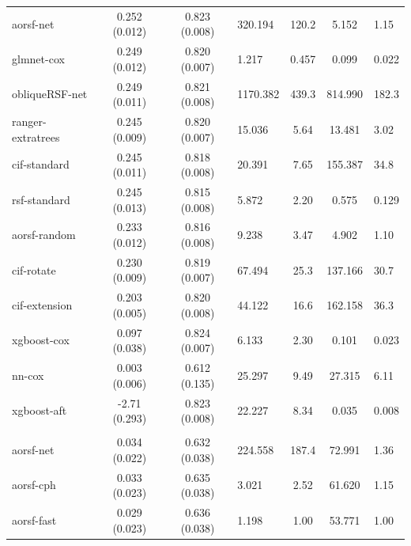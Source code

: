 \documentclass[twoside,11pt]{article}\usepackage[]{graphicx}\usepackage[]{xcolor}
\newenvironment{knitrout}{}{} %
\begin{document}
\begin{knitrout}
\begin{longtable}{lcclccl}
\hspace{1em}aorsf-net & 0.252 (0.012) & 0.823 (0.008) & 320.194 & 120.2 & 5.152 & 1.15\\
\hspace{1em}glmnet-cox & 0.249 (0.012) & 0.820 (0.007) & 1.217 & 0.457 & 0.099 & 0.022\\
\hspace{1em}obliqueRSF-net & 0.249 (0.011) & 0.821 (0.008) & 1170.382 & 439.3 & 814.990 & 182.3\\
\hspace{1em}ranger-extratrees & 0.245 (0.009) & 0.820 (0.007) & 15.036 & 5.64 & 13.481 & 3.02\\
\hspace{1em}cif-standard & 0.245 (0.011) & 0.818 (0.008) & 20.391 & 7.65 & 155.387 & 34.8\\
\hspace{1em}rsf-standard & 0.245 (0.013) & 0.815 (0.008) & 5.872 & 2.20 & 0.575 & 0.129\\
\hspace{1em}aorsf-random & 0.233 (0.012) & 0.816 (0.008) & 9.238 & 3.47 & 4.902 & 1.10\\
\hspace{1em}cif-rotate & 0.230 (0.009) & 0.819 (0.007) & 67.494 & 25.3 & 137.166 & 30.7\\
\hspace{1em}cif-extension & 0.203 (0.005) & 0.820 (0.008) & 44.122 & 16.6 & 162.158 & 36.3\\
\hspace{1em}xgboost-cox & 0.097 (0.038) & 0.824 (0.007) & 6.133 & 2.30 & 0.101 & 0.023\\
\hspace{1em}nn-cox & 0.003 (0.006) & 0.612 (0.135) & 25.297 & 9.49 & 27.315 & 6.11\\
\hspace{1em}xgboost-aft & -2.71 (0.293) & 0.823 (0.008) & 22.227 & 8.34 & 0.035 & 0.008\\
\addlinespace[0.3em]
\hline
\multicolumn{7}{l}{\textit{\textbf{sim}}}\\
\hline
\hspace{1em}aorsf-net & 0.034 (0.022) & 0.632 (0.038) & 224.558 & 187.4 & 72.991 & 1.36\\
\hspace{1em}aorsf-cph & 0.033 (0.023) & 0.635 (0.038) & 3.021 & 2.52 & 61.620 & 1.15\\
\hspace{1em}aorsf-fast & 0.029 (0.023) & 0.636 (0.038) & 1.198 & 1.00 & 53.771 & 1.00\\

\end{longtable}
\end{knitrout}
\end{document}
